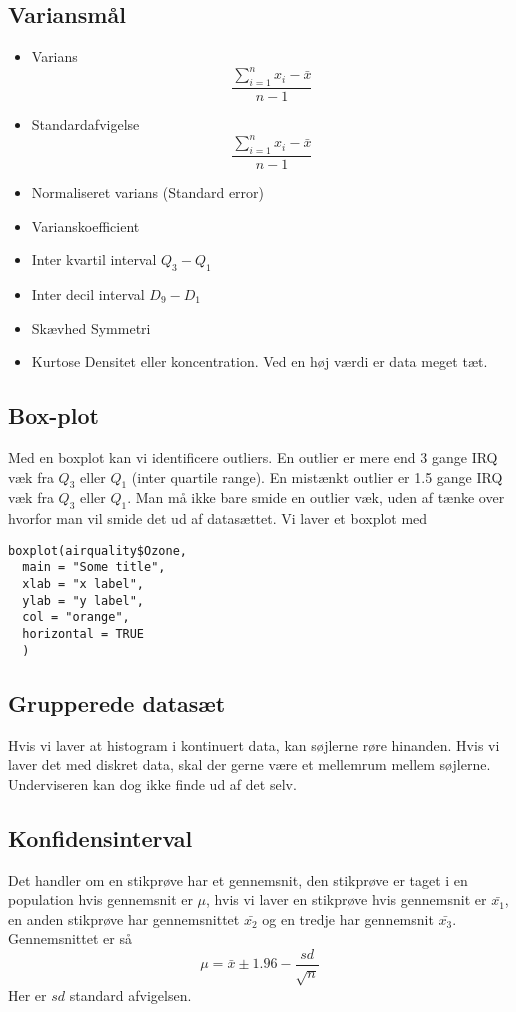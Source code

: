 \documentclass{article}
\begin{document}
\subsection{Variansmål}

\begin{itemize}
  \item Varians
    \subitem $$\frac{\sum^{n}_{i=1}x_i - \bar{x}}{n-1}$$
  \item Standardafvigelse
    \subitem $$\frac{\sum^{n}_{i=1}x_i - \bar{x}}{n-1}$$
  \item Normaliseret varians (Standard error) 
  \item Varianskoefficient
  \item Inter kvartil interval 
    \subitem $Q_3 - Q_1$
  \item Inter decil interval 
    \subitem $D_9-D_1$
  \item Skævhed
    \subitem Symmetri
  \item Kurtose
    \subitem Densitet eller koncentration. Ved en høj værdi er data meget tæt.
\end{itemize}

\subsection{Box-plot}
Med en boxplot kan vi identificere outliers. En outlier er mere end 3 gange IRQ
væk fra $Q_3$ eller $Q_1$ (inter quartile range). En mistænkt outlier er 1.5 gange IRQ
væk fra $Q_3$ eller $Q_1$.
Man må ikke bare smide en outlier væk, uden af tænke over hvorfor man vil smide
det ud af datasættet. Vi laver et boxplot med

\begin{lstlisting}
boxplot(airquality$Ozone,
  main = "Some title",
  xlab = "x label",
  ylab = "y label",
  col = "orange",
  horizontal = TRUE
  )
\end{lstlisting}

\subsection{Grupperede datasæt}
Hvis vi laver at histogram i kontinuert data, kan søjlerne røre hinanden. Hvis
vi laver det med diskret data, skal der gerne være et mellemrum mellem søjlerne.
Underviseren kan dog ikke finde ud af det selv.

\subsection{Konfidensinterval}
Det handler om en stikprøve har et gennemsnit, den stikprøve er
    taget i en population hvis gennemsnit er $\mu$, hvis vi laver en stikprøve
    hvis gennemsnit er $\bar{x_1}$, en anden stikprøve har gennemsnittet
    $\bar{x_2}$ og en tredje har gennemsnit $\bar{x_3}$. Gennemsnittet er så 
    $$\mu = \bar{x} \pm 1.96 - \frac{sd}{\sqrt{n}}  $$ Her er $sd$ standard
    afvigelsen.
    
\end{document}
